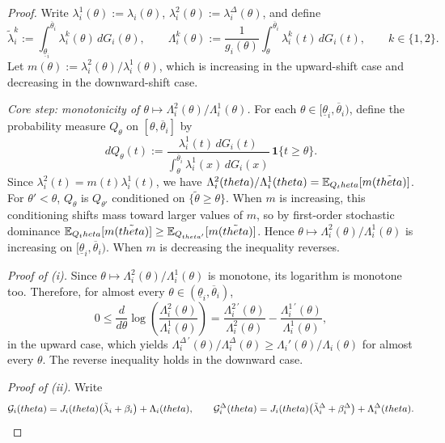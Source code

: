 \documentclass[master.tex]{subfiles}
\begin{document}
\begin{proof}
Write $\lambda_i^1(\theta):=\lambda_i(\theta)$, $\lambda_i^2(\theta):=\lambda_i^\Delta(\theta)$, and define
\[
\tilde\lambda_i^k := \int_{\underline\theta_i}^{\overline\theta_i}\lambda_i^k(\theta)\,dG_i(\theta), \qquad \Lambda_i^k(\theta) := \frac{1}{g_i(\theta)}\int_\theta^{\overline\theta_i}\lambda_i^k(t)\,dG_i(t), \qquad k\in\{1,2\}.
\]
Let $m(\theta):=\lambda_i^2(\theta)/\lambda_i^1(\theta)$, which is increasing in the upward-shift case and decreasing in the downward-shift case.


\noindent\textit{Core step: monotonicity of $\theta\mapsto\Lambda_i^2(\theta)/\Lambda_i^1(\theta)$.}
For each $\theta\in[\underline\theta_i,\overline\theta_i)$, define the probability measure $Q_\theta$ on $[\theta,\overline\theta_i]$ by
\[
dQ_\theta(t) := \frac{\lambda_i^1(t)\,dG_i(t)}{\displaystyle\int_\theta^{\overline\theta_i}\lambda_i^1(x)\,dG_i(x)}\,\mathbf{1}\{t\ge\theta\}.
\]
Since $\lambda_i^2(t)=m(t)\lambda_i^1(t)$, we have $\Lambda_i^2(theta)/\Lambda_i^1(theta) = \mathbb{E}_{Q_theta}[m(\tilde{theta})]$. For $\theta'<\theta$, $Q_\theta$ is $Q_{\theta'}$ conditioned on $\{\tilde\theta\ge\theta\}$. When $m$ is increasing, this conditioning shifts mass toward larger values of $m$, so by first-order stochastic dominance $\mathbb{E}_{Q_theta}[m(\tilde{theta})] \ge \mathbb{E}_{Q_{theta'}}[m(\tilde{theta})]$. Hence $\theta\mapsto\Lambda_i^2(\theta)/\Lambda_i^1(\theta)$ is increasing on $[\underline\theta_i,\overline\theta_i)$. When $m$ is decreasing the inequality reverses.


\noindent\textit{Proof of (i).}
Since $\theta\mapsto\Lambda_i^2(\theta)/\Lambda_i^1(\theta)$ is monotone, its logarithm is monotone too. Therefore, for almost every $\theta\in(\underline\theta_i,\overline\theta_i)$,
\[
0 \le \frac{d}{d\theta}\log\!\left(\frac{\Lambda_i^2(\theta)}{\Lambda_i^1(\theta)}\right) = \frac{\Lambda_i^{2\,\prime}(\theta)}{\Lambda_i^2(\theta)} - \frac{\Lambda_i^{1\,\prime}(\theta)}{\Lambda_i^1(\theta)},
\]
in the upward case, which yields $\Lambda_i^{\Delta\,\prime}(\theta)/\Lambda_i^\Delta(\theta) \ge \Lambda_i'(\theta)/\Lambda_i(\theta)$ for almost every $\theta$. The reverse inequality holds in the downward case.


\noindent\textit{Proof of (ii).}
Write
\[
\mathcal{G}_i(theta) = J_i(theta)\bigl(\tilde\lambda_i+\beta_i\bigr)+\Lambda_i(theta), \qquad \mathcal{G}_i^\Delta(theta) = J_i(theta)\bigl(\tilde\lambda_i^\Delta+\beta_i^{\Delta}\bigr)+\Lambda_i^\Delta(theta).
\]



\end{proof}
\end{document}
